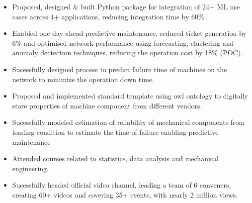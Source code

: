 \documentclass[10pt,a4paper,ragged2e,withhyper]{altacv}
\begin{document}
\begin{paracol}{2}

\begin{itemize}
\item Proposed, designed \& built Python package for integration of 24+ ML use cases across 4+ applications, reducing integration time by 60\%.
\end{itemize}

\begin{itemize}
\item Enabled one day ahead predictive maintenance, reduced ticket generation by 6\% and optimised network performance using forecasting, clustering  and anomaly dectection techniques, reducing the operation cost by 18\% (POC).
\end{itemize}

\switchcolumn
{}
\label{sec:orgc95c63c}
\par\divider

\par\divider

\label{sec:org934bac5}

\begin{itemize}
\item Sucessfully designed process to predict failure time of machines on the network to minimize the operation down time.
\item Proposed and implemented standard template using owl ontology to digitally store properties of machine component from different vendors.
\item Sucessfully modeled estimation of reliability of mechanical components from loading condition to estimate the time of failure enabling predictive maintenance
\end{itemize}

\begin{itemize}
\item Attended courses related to statistics, data analysis and mechanical engineering.
\item Sucessfully headed official video channel, leading a team of 6 conveners, creating 60+ videos and covering 35+ events, with nearly 2 million views.
\end{itemize}


\end{paracol}
\end{document}
